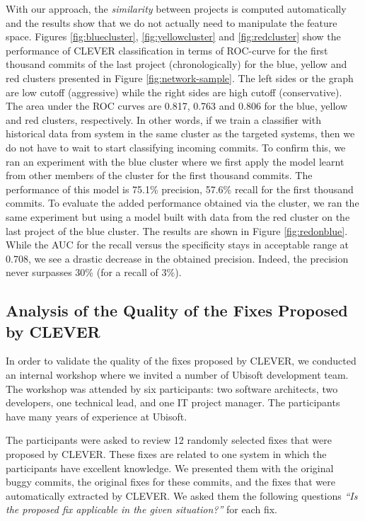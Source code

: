 \documentclass[sigconf]{acmart}
\begin{document}
With our approach, the \emph{similarity} between projects is computed
automatically and the results show that we do not actually need to
manipulate the feature space. Figures \ref{fig:bluecluster},
\ref{fig:yellowcluster} and \ref{fig:redcluster} show the performance of
CLEVER classification in terms of ROC-curve for the first thousand
commits of the last project (chronologically) for the blue, yellow and
red clusters presented in Figure \ref{fig:network-sample}. The left
sides or the graph are low cutoff (aggressive) while the right sides are
high cutoff (conservative). The area under the ROC curves are 0.817,
0.763 and 0.806 for the blue, yellow and red clusters, respectively. In
other words, if we train a classifier with historical data from system
in the same cluster as the targeted systems, then we do not have to wait
to start classifying incoming commits. To confirm this, we ran an
experiment with the blue cluster where we first apply the model learnt
from other members of the cluster for the first thousand commits. The
performance of this model is 75.1\% precision, 57.6\% recall for the
first thousand commits. To evaluate the added performance obtained via
the cluster, we ran the same experiment but using a model built with
data from the red cluster on the last project of the blue cluster. The
results are shown in Figure \ref{fig:redonblue}. While the AUC for the
recall versus the specificity stays in acceptable range at 0.708, we see
a drastic decrease in the obtained precision. Indeed, the precision
never surpasses 30\% (for a recall of 3\%).

 

\subsection{Analysis of the Quality of the Fixes Proposed by
CLEVER}\label{analysis-of-the-quality-of-the-fixes-proposed-by-clever}

In order to validate the quality of the fixes proposed by CLEVER, we
conducted an internal workshop where we invited a number of Ubisoft
development team. The workshop was attended by six participants: two
software architects, two developers, one technical lead, and one IT
project manager. The participants have many years of experience at
Ubisoft.

The participants were asked to review 12 randomly selected fixes that
were proposed by CLEVER. These fixes are related to one system in which
the participants have excellent knowledge. We presented them with the
original buggy commits, the original fixes for these commits, and the
fixes that were automatically extracted by CLEVER. We asked them the
following questions \emph{``Is the proposed fix applicable in the given
situation?''} for each fix.
\end{document}
